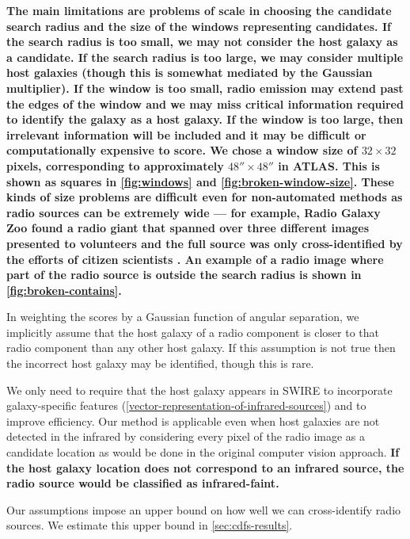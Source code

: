 \documentclass[fleqn,usenatbib,usedcolumn]{mnras}
\newcommand{\edited}[1]{{\bf {#1}}}
\begin{document}
    \edited{The main limitations are problems of scale in choosing the
    candidate search radius and the size of the windows
    representing candidates. If the search radius is too small, we may not
    consider the host galaxy as a candidate. If the search radius is too
    large, we may consider multiple host galaxies (though this is somewhat
    mediated by the Gaussian multiplier). If the window is too small, radio
    emission may extend past the edges of the window and we may miss critical
    information required to identify the galaxy as a host galaxy. If the
    window is too large, then irrelevant information will be included and it
    may be difficult or computationally expensive to score. We chose a
    window size of $32 \times 32$ pixels, corresponding to approximately $48'' \times 48''$ in
    ATLAS. This is shown as squares in \autoref{fig:windows} and
    \autoref{fig:broken-window-size}. These kinds of size problems are
    difficult even for non-automated methods as radio sources can be extremely
    wide --- for example, Radio Galaxy Zoo found a radio giant that spanned
    over three different images presented to volunteers and the full source
    was only cross-identified by the efforts of citizen scientists
    \citep{banfield15}. An example of a radio image where part of the radio
    source is outside the search radius is shown in
    \autoref{fig:broken-contains}.}

    In weighting the scores by a Gaussian function of angular
    separation, we implicitly assume that the host galaxy of a radio component
    is closer to that radio component than any other host galaxy. If this
    assumption is not true then the incorrect host galaxy may be identified, though
    this is rare.

    We only need to require that the host galaxy appears in SWIRE to
    incorporate galaxy-specific features
    (\autoref{vector-representation-of-infrared-sources}) and to improve
    efficiency. Our method is applicable even when host galaxies are not detected in
    the infrared by considering every pixel of the radio image as a candidate
    location as would be done in the original computer vision approach. \edited{If the host galaxy location does not correspond to an infrared source, the radio source would be classified as infrared-faint.}

    Our assumptions impose an upper bound on how well we can cross-identify
    radio sources. We estimate this upper bound in \autoref{sec:cdfs-results}.
\end{document}
